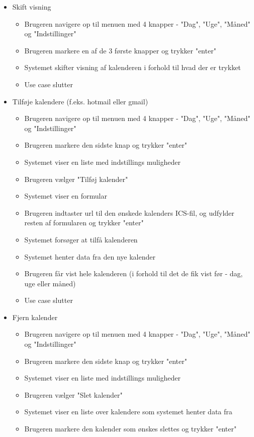 \documentclass{article}
\begin{document}
\begin{itemize}
   \item Skift visning
   \begin{itemize}
   \item Brugeren navigere op til menuen med 4 knapper - "Dag", "Uge", "Måned" og "Indstillinger"
   \item Brugeren markere en af de 3 første knapper og trykker "enter"
   \item Systemet skifter visning af kalenderen i forhold til hvad der er trykket
   \item Use case slutter
   \end{itemize}
   \item Tilføje kalendere (f.eks. hotmail eller gmail)
   \begin{itemize}
   \item Brugeren navigere op til menuen med 4 knapper - "Dag", "Uge", "Måned" og "Indstillinger"
   \item Brugeren markere den sidste knap og trykker "enter"
   \item Systemet viser en liste med indstillings muligheder
   \item Brugeren vælger "Tilføj kalender"
   \item Systemet viser en formular
   \item Brugeren indtaster url til den ønskede kalenders ICS-fil, og udfylder resten af formularen og trykker "enter"
   \item Systemet forsøger at tilfå kalenderen
   \item Systemet henter data fra den nye kalender
   \item Brugeren får vist hele kalenderen (i forhold til det de fik vist før - dag, uge eller måned)
   \item Use case slutter
   \end{itemize}
   \item Fjern kalender
   \begin{itemize}
   \item Brugeren navigere op til menuen med 4 knapper - "Dag", "Uge", "Måned" og "Indstillinger"
   \item Brugeren markere den sidste knap og trykker "enter"
   \item Systemet viser en liste med indstillings muligheder
   \item Brugeren vælger "Slet kalender"
   \item Systemet viser en liste over kalendere som systemet henter data fra
   \item Brugeren markere den kalender som ønskes slettes og trykker "enter"

\end{itemize}
\end{itemize}
\end{document}
